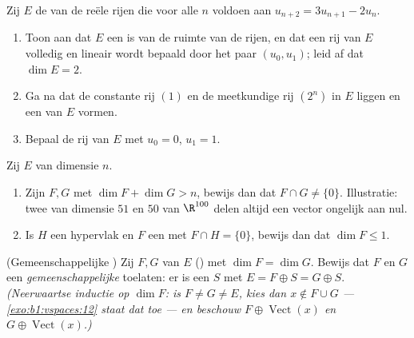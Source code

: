 \begin{exercise}[$\star\star$]\label{exo:b1:findim:10}
Zij $E$ de  van de reële rijen die voor alle $n$ voldoen
aan $u_{n+2} = 3u_{n+1} - 2u_n$.
\begin{enumerate}
  \item Toon aan dat $E$ een  is van de ruimte van de
        rijen, en dat een rij van $E$ volledig en lineair wordt
        bepaald door het paar $(u_0, u_1)$; leid af dat $\dim E =
        2$.
  \item Ga na dat de constante rij $(1)$ en de meetkundige rij
        $(2^n)$ in $E$ liggen en een  van $E$ vormen.
  \item Bepaal de rij van $E$ met $u_0 = 0$, $u_1 = 1$.
\end{enumerate}
\end{exercise}

\begin{exercise}[$\star\star$]\label{exo:b1:findim:11}
Zij $E$ van dimensie $n$.
\begin{enumerate}
  \item Zijn $F, G$  met $\dim F + \dim G > n$, bewijs
        dan dat $F \cap G \neq \{0\}$. Illustratie: twee
         van dimensie $51$ en $50$ van $\R^{100}$ delen
        altijd een vector ongelijk aan nul.
  \item Is $H$ een hypervlak en $F$ een  met $F \cap H =
        \{0\}$, bewijs dan dat $\dim F \leq 1$.
\end{enumerate}
\end{exercise}

\begin{exercise}[$\star\star\star$]\label{exo:b1:findim:12}
(Gemeenschappelijke ) Zij $F, G$  van $E$
() met $\dim F = \dim G$. Bewijs dat $F$ en $G$ een
\emph{gemeenschappelijke}  toelaten: er is een
 $S$ met $E = F \oplus S = G \oplus S$. \emph{(Neerwaartse
inductie op $\dim F$: is $F \neq G \neq E$, kies dan $x \notin F
\cup G$ --- \cref{exo:b1:vspaces:12} staat dat toe --- en beschouw
$F \oplus \operatorname{Vect}(x)$ en $G \oplus
\operatorname{Vect}(x)$.)}
\end{exercise}

